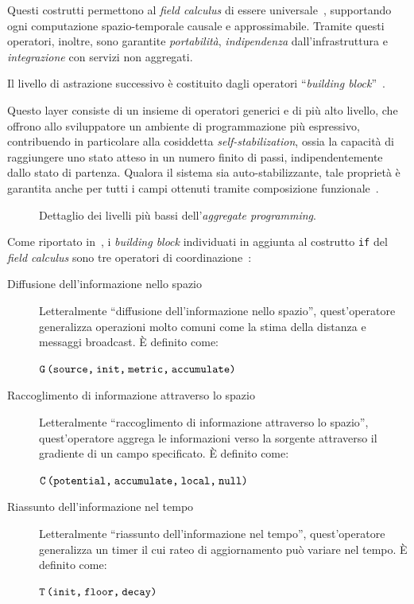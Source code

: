 Questi costrutti permettono al \emph{field calculus} di essere universale~\cite{10.1007/978-3-319-92408-3_1},
supportando ogni computazione spazio-temporale causale e approssimabile.
Tramite questi operatori, inoltre, sono garantite \emph{portabilità}, \emph{indipendenza} dall'infrastruttura e \emph{integrazione} con servizi non aggregati.

Il livello di astrazione successivo è costituito dagli operatori ``\emph{building block}''~\cite{BV-FOCAS2014}.


Questo layer consiste di un insieme di operatori generici e di più alto livello, che offrono allo sviluppatore un ambiente di programmazione più espressivo,
contribuendo in particolare alla cosiddetta \emph{self-stabilization}, ossia la capacità di raggiungere uno stato atteso in un numero finito di passi,
indipendentemente dallo stato di partenza.
Qualora il sistema sia auto-stabilizzante, tale proprietà è garantita anche per tutti i campi ottenuti tramite composizione funzionale~\cite{BV-FOCAS2014}.

\begin{figure}[htbp]
  \centering
  \caption{Dettaglio dei livelli più bassi dell'\emph{aggregate programming}.}%
  \label{fig:stack-detail}
\end{figure}

Come riportato in~, i \emph{building block} individuati in aggiunta al costrutto \texttt{if} del \emph{field calculus} sono tre operatori di coordinazione~\cite{7274429,BV-FOCAS2014}:

\begin{description}
  \item[Diffusione dell'informazione nello spazio]
    Letteralmente \enquote{diffusione dell'informazione nello spazio},
    quest'operatore generalizza operazioni molto comuni come la stima della distanza e messaggi broadcast.
    È definito come:

    \(\texttt{G\,(source,\:init,\:metric,\:accumulate)}\)

  \item[Raccoglimento di informazione attraverso lo spazio]
    Letteralmente \enquote{raccoglimento di informazione attraverso lo spazio},
    quest'operatore aggrega le informazioni verso la sorgente attraverso il gradiente di un campo specificato.
    È definito come:

    \(\texttt{C\,(potential,\:accumulate,\:local,\:null)}\)

  \item[Riassunto dell'informazione nel tempo]
    Letteralmente \enquote{riassunto dell'informazione nel tempo},
    quest'operatore generalizza un timer il cui rateo di aggiornamento può variare nel tempo.
    È definito come:

    \(\texttt{T\,(init,\:floor,\:decay)}\)
\end{description}

